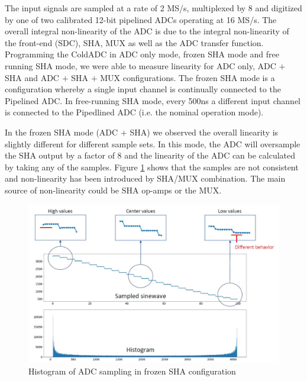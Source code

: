 \label{sec:5.4}


The input signals are sampled at a rate of 2 MS/s, multiplexed by 8 and digitized by one of two calibrated 12-bit pipelined ADCs operating at 16 MS/s. The overall integral non-linearity of the ADC is due to the integral non-linearity of the front-end (SDC), SHA, MUX as well as the ADC transfer function. Programming the ColdADC in ADC only mode, frozen SHA mode and free running SHA mode, we were able to measure linearity for ADC only, ADC $+$ SHA and ADC $+$ SHA $+$ MUX configurations. 
The frozen SHA mode is a configuration whereby a single input channel is continually connected to the Pipelined ADC. In free-running SHA mode, every 500ns a different input channel is connected to the Pipedlined ADC (i.e. the nominal operation mode).

In the frozen SHA mode (ADC $+$ SHA) we observed the overall linearity is slightly different for different sample sets. In this mode, the ADC will oversample the SHA output by a factor of 8 and the linearity of the ADC can be calculated by taking any of the samples. Figure \ref{fig:sha_sample_hist} shows that the samples are not consistent and non-linearity has been introduced by SHA/MUX combination. The main source of non-linearity could be SHA op-amps or the MUX.
\begin{figure}[h!]
\centering
  \includegraphics[width=0.7\linewidth]{figures/prakash_fig/sha_sample_hist.JPG}
  \caption{Histogram of ADC sampling in frozen SHA configuration}
  \label{fig:sha_sample_hist}
\end{figure}

